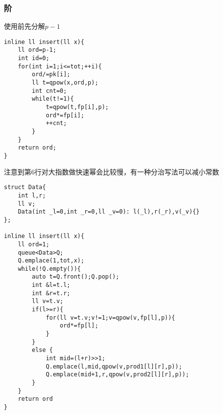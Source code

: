 \documentclass{ctexart}
\begin{document}
\subsubsection{阶}
使用前先分解$p-1$
\begin{lstlisting}
inline ll insert(ll x){
    ll ord=p-1;
    int id=0;
    for(int i=1;i<=tot;++i){
        ord/=pk[i];
        ll t=qpow(x,ord,p);
        int cnt=0;
        while(t!=1){
            t=qpow(t,fp[i],p);
            ord*=fp[i];
            ++cnt;
        }
    }
    return ord;
}
\end{lstlisting}
注意到第6行对大指数做快速幂会比较慢，有一种分治写法可以减小常数
\begin{lstlisting}
struct Data{
    int l,r;
    ll v;
    Data(int _l=0,int _r=0,ll _v=0): l(_l),r(_r),v(_v){}
};

inline ll insert(ll x){
    ll ord=1;
    queue<Data>Q;
    Q.emplace(1,tot,x);
    while(!Q.empty()){
        auto t=Q.front();Q.pop();
        int &l=t.l;
        int &r=t.r;
        ll v=t.v;
        if(l>=r){
            for(ll v=t.v;v!=1;v=qpow(v,fp[l],p)){
                ord*=fp[l];
            }
        }
        else {
            int mid=(l+r)>>1;
            Q.emplace(l,mid,qpow(v,prod1[l][r],p));
            Q.emplace(mid+1,r,qpow(v,prod2[l][r],p));
        }
    }
    return ord
}
\end{lstlisting}
\end{document}
